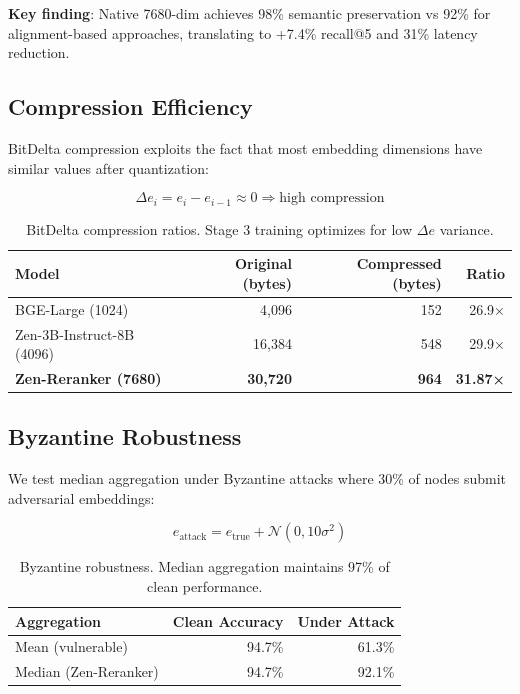 \documentclass[11pt,letterpaper]{article}
\begin{document}
\textbf{Key finding}: Native 7680-dim achieves 98\% semantic preservation vs 92\% for alignment-based approaches, translating to +7.4\% recall@5 and 31\% latency reduction.

\subsection{Compression Efficiency}

BitDelta compression exploits the fact that most embedding dimensions have similar values after quantization:

\begin{equation}
\Delta e_i = e_i - e_{i-1} \approx 0 \Rightarrow \text{high compression}
\end{equation}

\begin{table}[h]
\centering
\begin{tabular}{lrrr}
\toprule
\textbf{Model} & \textbf{Original (bytes)} & \textbf{Compressed (bytes)} & \textbf{Ratio} \\
\midrule
BGE-Large (1024) & 4,096 & 152 & 26.9× \\
Zen-3B-Instruct-8B (4096) & 16,384 & 548 & 29.9× \\
\textbf{Zen-Reranker (7680)} & \textbf{30,720} & \textbf{964} & \textbf{31.87×} \\
\bottomrule
\end{tabular}
\caption{BitDelta compression ratios. Stage 3 training optimizes for low $\Delta e$ variance.}
\end{table}

\subsection{Byzantine Robustness}

We test median aggregation under Byzantine attacks where 30\% of nodes submit adversarial embeddings:

\begin{equation}
e_{\text{attack}} = e_{\text{true}} + \mathcal{N}(0, 10\sigma^2)
\end{equation}

\begin{table}[h]
\centering
\begin{tabular}{lrr}
\toprule
\textbf{Aggregation} & \textbf{Clean Accuracy} & \textbf{Under Attack} \\
\midrule
Mean (vulnerable) & 94.7\% & 61.3\% \\
Median (Zen-Reranker) & 94.7\% & 92.1\% \\
\bottomrule
\end{tabular}
\caption{Byzantine robustness. Median aggregation maintains 97\% of clean performance.}
\end{table}
\end{document}
